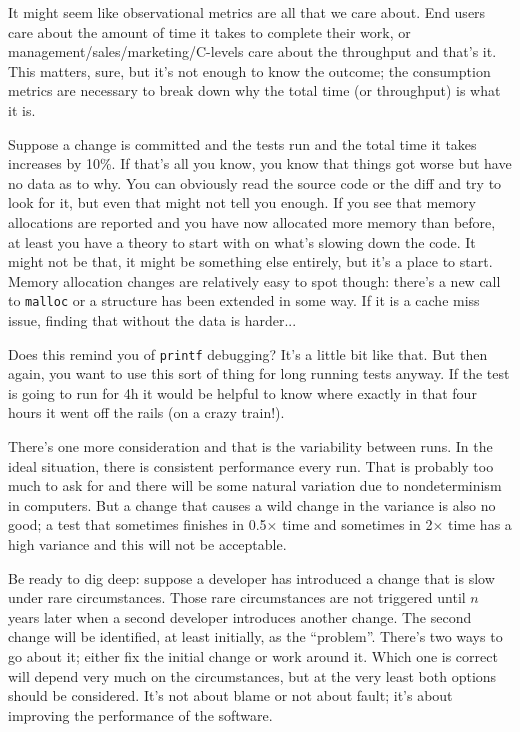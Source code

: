 \documentclass[a4paper]{report}
\begin{document}
It might seem like observational metrics are all that we care about. End users care about the amount of time it takes to complete their work, or management/sales/marketing/C-levels care about the throughput and that's it. This matters, sure, but it's not enough to know the outcome; the consumption metrics are necessary to break down why the total time (or throughput) is what it is.

Suppose a change is committed and the tests run and the total time it takes increases by 10\%. If that's all you know, you know that things got worse but have no data as to why. You can obviously read the source code or the diff and try to look for it, but even that might not tell you enough. If you see that memory allocations are reported and you have now allocated more memory than before,  at least you have a theory to start with on what's slowing down the code. It might not be that, it might be something else entirely, but it's a place to start. Memory allocation changes are relatively easy to spot though: there's a new call to \texttt{malloc} or a structure has been extended in some way. If it is a cache miss issue, finding that without the data is harder...

Does this remind you of \texttt{printf} debugging? It's a little bit like that. But then again, you want to use this sort of thing for long running tests anyway. If the test is going to run for 4h it would be helpful to know where exactly in that four hours it went off the rails (on a crazy train!). 

There's one more consideration and that is the variability between runs. In the ideal situation, there is consistent performance every run. That is probably too much to ask for and there will be some natural variation due to nondeterminism in computers. But a change that causes a wild change in the variance is also no good; a test that sometimes finishes in 0.5$\times$ time and sometimes in 2$\times$ time has a high variance and this will not be acceptable. 

Be ready to dig deep: suppose a developer has introduced a change that is slow under rare circumstances. Those rare circumstances are not triggered until $n$ years later when a second developer introduces another change. The second change will be identified, at least initially, as the ``problem''. There's two ways to go about it; either fix the initial change or work around it. Which one is correct will depend very much on the circumstances, but at the very least both options should be considered. It's not about blame or not about fault; it's about improving the performance of the software.
\end{document}
